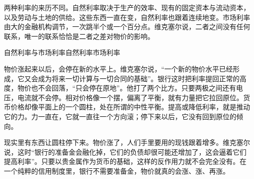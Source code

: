 两种利率的来历不同。自然利率取决于生产的效率、现有的固定资本与流动资本，以及劳动与土地的供给\cite{wicksell1936}。这些东西一直在变，自然利率也跟着连续地变。市场利率由大的金融机构调节，一次跳半个或一个百分点\cite{wicksell1936}。维克塞尔说，二者之间没有任何联系，唯一的联系恰恰是二者之差对物价的影响\cite{wicksell1907}。

\begin{compare}{自然利率与市场利率}{自然利率}{市场利率}
\end{compare}

物价涨起来以后，会停在新的水平上。维克塞尔说，“一个新的物价水平已经形成，它又会成为将来一切计算与一切合同的基础”\cite{wicksell1907}。银行这时把利率提回正常的高度，物价也不会回落，“只会停在原地”\cite{wicksell1907}。他打了两个比方。只要两极之间还有电压，电流就不会停\cite{wicksell1907}。相对价格像一个摆，偏离了平衡，就有力量把它拉回原位\cite{wicksell1936}。货币价格却像平面上的一个圆柱，处在所谓的中性平衡\cite{wicksell1936}。提高或降低利率，就是推动它的力\cite{wicksell1936}。力一直在，它就一直往一个方向滚；停下来以后，它没有回到原位的倾向\cite{wicksell1936}。

现实里有东西让圆柱停下来。物价涨了，人们手里要用的现钱跟着增多。维克塞尔说，这时“银行的准备金会融化掉，它们的负债却很可能还增加了，这会逼着它们提高利率”\cite{wicksell1907}。只要以贵金属作为货币的基础，这样的反作用力就不会完全没有\cite{wicksell1936}。在一个纯粹的信用制度里，银行不需要准备金，物价就真的会涨、涨、再涨。

